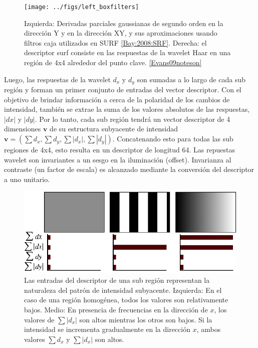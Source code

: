 \begin{figure}[tbhp]
   \centering
        \texttt{[image: ../figs/left\_boxfilters]}
    \caption[]{Izquierda: Derivadas parciales gaussianas de segundo orden en la dirección Y y en la dirección XY, y sus aproximaciones usando filtros caja utilizados en SURF \ref{Bay:2008:SRF}. Derecha: el descriptor surf consiste en las respuestas de la wavelet Haar en una región de 4x4 alrededor del punto clave. \ref{Evans09noteson}}
   \label{fig:left_boxfilters}                %
\end{figure}

Luego, las respuestas de la wavelet $d_x$ y $d_y$ son sumadas a lo largo de cada sub región y forman un primer conjunto de entradas del vector descriptor. Con el objetivo de brindar información a cerca de la polaridad de los cambios de intensidad, también se extrae la suma de los valores absolutos de las respuestas, $|dx|$ y $|dy|$. Por lo tanto, cada sub región tendrá un vector descriptor de 4 dimensiones $\mathbf{v}$ de su estructura subyacente de intensidad $\mathbf{v}=(\sum{d_x},\sum{d_y},\sum{|d_x|},\sum{|d_y|})$. Concatenando esto para todas las sub regiones de 4x4, esto resulta en un descriptor de longitud 64. Las repuestas wavelet son invariantes a un sesgo en la iluminación (offset). Invarianza al contraste (un factor de escala) es alcanzado mediante la conversión del descriptor a uno unitario.

\begin{figure}[tbhp]
   \centering
        \includegraphics[scale=0.4]{./figs/descriptorresponses}
    \caption[]{Las entradas del descriptor de una sub región representan la naturaleza del patrón de intensidad subyacente. Izquierda: En el caso de una región homogénea, todos los valores son relativamente bajos. Medio: En presencia de frecuencias en la dirección de $x$, los valores de $\sum{|d_x|}$ son altos mientras los otros son bajos. Si la intensidad se incrementa gradualmente en la dirección $x$, ambos valores $\sum{d_x}$ y $\sum{|d_x|}$ son altos.}
   \label{fig:descriptorresponses}                %
\end{figure}

